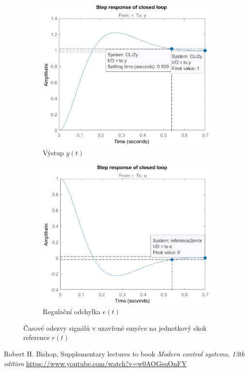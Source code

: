 \documentclass[twoside]{article}
\begin{document}
\begin{figure}[htbp]
	\centering
	\begin{subfigure}{0.45\textwidth}
		\includegraphics[width=\linewidth]{step_response.eps}
		\caption{Výstup $y(t)$}
		\label{fig:step}
	\end{subfigure}
	\begin{subfigure}{0.45\textwidth}
		\includegraphics[width=\linewidth]{step_response_error.eps}
		\caption{Regulační odchylka $e(t)$}
		\label{fig:step_error}
	\end{subfigure}
	\caption{Časové odezvy signálů v uzavřené smyčce na jednotkový skok reference $r(t)$}
\end{figure}

\begin{thebibliography}{9}

	Robert H. Bishop, Supplementary lectures to book \emph{Modern control systems, 13th edition} \url{https://www.youtube.com/watch?v=w0AOGeqOnFY}

\end{thebibliography}
\end{document}
